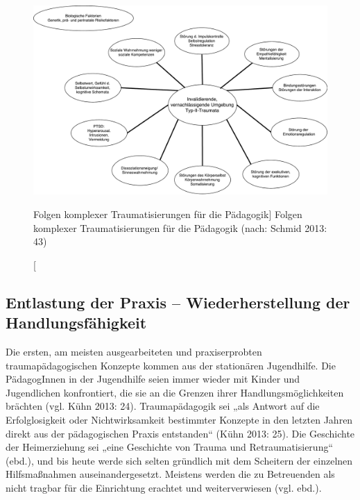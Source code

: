 \begin{figure}[h]
  \centering
  \includegraphics[scale=0.45]{abbildung4}
  \caption
      [Folgen komplexer Traumatisierungen für die Pädagogik]
      {Folgen komplexer Traumatisierungen für die Pädagogik (nach: Schmid 2013: 43)}
  \label{fig:folgen}
\end{figure}

\subsection{Entlastung der Praxis – Wiederherstellung der Handlungsfähigkeit}
Die ersten, am meisten ausgearbeiteten und praxiserprobten traumapädagogischen Konzepte kommen aus der stationären Jugendhilfe. Die PädagogInnen in der Jugendhilfe seien immer wieder mit Kinder und Jugendlichen konfrontiert, die sie an die Grenzen ihrer Handlungsmöglichkeiten brächten (vgl. Kühn 2013: 24). Traumap{\"a}dagogik sei „als Antwort auf die Erfolglosigkeit oder Nichtwirksamkeit bestimmter Konzepte in den letzten Jahren direkt aus der pädagogischen Praxis entstanden“ (Kühn 2013: 25). Die Geschichte der Heimerziehung sei „eine Geschichte von Trauma und Retraumatisierung“ (ebd.), und bis heute werde sich selten gründlich mit dem Scheitern der einzelnen Hilfsmaßnahmen auseinandergesetzt. Meistens werden die zu Betreuenden als nicht tragbar für die Einrichtung erachtet und weiterverwiesen (vgl. ebd.).

